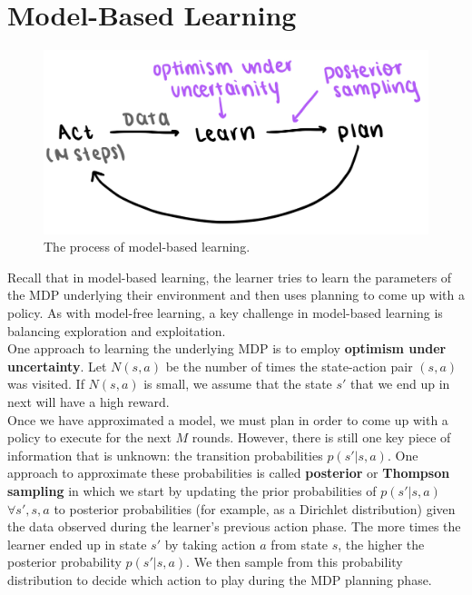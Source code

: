 \section{Model-Based Learning}
\begin{figure}[ht!]
    \centering
    \includegraphics[scale=0.2]{../ReinforcementLearning/fig/model-based.jpeg}
    \caption{The process of model-based learning.}
\end{figure}

Recall that in model-based learning, the learner tries to learn the parameters of the MDP underlying their environment and then uses planning to come up with a policy. As with model-free learning, a key challenge in model-based learning is balancing exploration and exploitation.\\

One approach to learning the underlying MDP is to employ \textbf{optimism under uncertainty}. Let $N(s, a)$ be the number of times the state-action pair $(s, a)$ was visited. If $N(s, a)$ is small, we assume that the state $s'$ that we end up in next will have a high reward.\\

Once we have approximated a model, we must plan in order to come up with a policy to execute for the next $M$ rounds. However, there is still one key piece of information that is unknown: the transition probabilities $p(s'|s, a)$. One approach to approximate these probabilities is called \textbf{posterior} or \textbf{Thompson sampling} in which we start by updating the prior probabilities of $p(s'|s, a)$ $\forall s', s, a$ to posterior probabilities (for example, as a Dirichlet distribution) given the data observed during the learner's previous action phase. The more times the learner ended up in state $s'$ by taking action $a$ from state $s$, the higher the posterior probability $p(s'|s, a)$. We then sample from this probability distribution to decide which action to play during the MDP planning phase.
